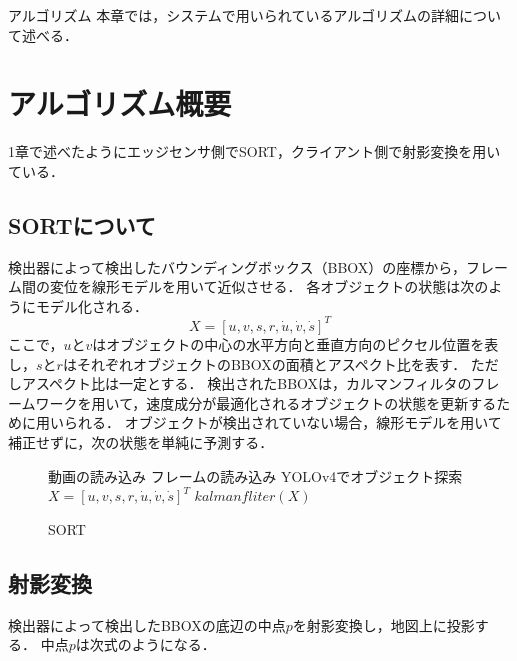\chapterhead
{アルゴリズム}
{本章では，システムで用いられているアルゴリズムの詳細について述べる．}

\section{アルゴリズム概要}
1章で述べたようにエッジセンサ側でSORT，クライアント側で射影変換を用いている．

\subsection{SORTについて}
検出器によって検出したバウンディングボックス（BBOX）の座標から，フレーム間の変位を線形モデルを用いて近似させる．
各オブジェクトの状態は次のようにモデル化される．
\begin{equation}
  X = [u, v, s, r, \dot{u} , \dot{v} , \dot{s}]^T
\end{equation}
ここで，$u$と$v$はオブジェクトの中心の水平方向と垂直方向のピクセル位置を表し，$s$と$r$はそれぞれオブジェクトのBBOXの面積とアスペクト比を表す．
ただしアスペクト比は一定とする．
検出されたBBOXは，カルマンフィルタのフレームワークを用いて，速度成分が最適化されるオブジェクトの状態を更新するために用いられる．
オブジェクトが検出されていない場合，線形モデルを用いて補正せずに，次の状態を単純に予測する．

\begin{figure}[!t]
	\begin{algorithm}[H]
	    \caption{SORT}
	    \label{alg1}
	    \begin{algorithmic}[1]
	    \STATE 動画の読み込み
	    \WHILE{}
	    \STATE フレームの読み込み
	    \STATE YOLOv4でオブジェクト探索
	    \STATE $X = [u, v, s, r, \dot{u} , \dot{v} , \dot{s}]^T$ 
	    \STATE $kalmanfliter(X)$
	    \ENDIF
	    \ENDWHILE
	    \end{algorithmic}
	\end{algorithm}
\end{figure}
      
      \subsection{射影変換}
      検出器によって検出したBBOXの底辺の中点$p$を射影変換し，地図上に投影する．
      中点$p$は次式のようになる．

